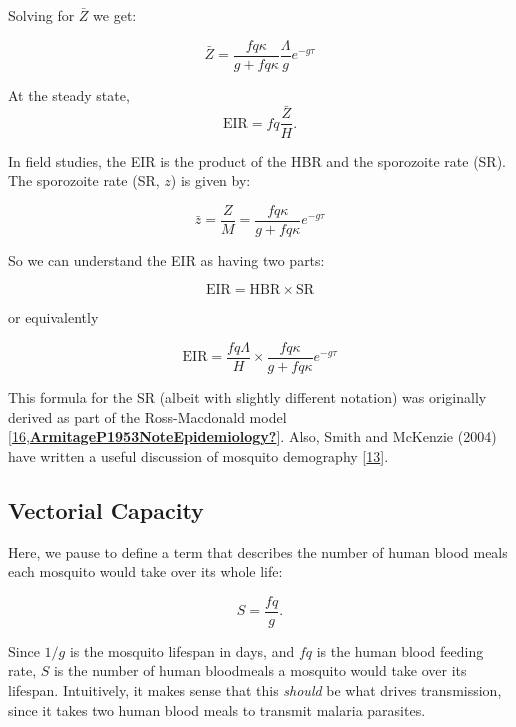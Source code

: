\documentclass[
]{book}
\begin{document}
Solving for \(\bar Z\) we get:

\begin{equation}
\bar Z =  \frac{f q \kappa}{g + fq \kappa} \frac{\Lambda}{g} e^{-g\tau} 
\end{equation}

At the steady state, \[\mbox{EIR} = fq \frac{\bar Z}{H}.\]

In field studies, the EIR is the product of the HBR and the sporozoite rate (SR). The sporozoite rate (SR, \(z\)) is given by:

\begin{equation}
\bar z =  \frac{Z}{M} = \frac{f q \kappa}{g + fq \kappa} e^{-g\tau} 
\end{equation}

So we can understand the EIR as having two parts:

\begin{equation}
\mbox{EIR} = \mbox{HBR} \times  \mbox{SR} 
\end{equation}

or equivalently

\begin{equation}
\mbox{EIR} = \frac{\textstyle{fq\Lambda}}{\textstyle{H}} \times \frac{\textstyle{f q \kappa}}{\textstyle{g + fq \kappa}} e^{-g\tau} 
\end{equation}

This formula for the SR (albeit with slightly different notation) was originally derived as part of the Ross-Macdonald model {[}\protect\hyperlink{ref-MacdonaldG1952_SporozoiteRate}{16},\protect\hyperlink{ref-ArmitageP1953NoteEpidemiology}{\textbf{ArmitageP1953NoteEpidemiology?}}{]}. Also, Smith and McKenzie (2004) have written a useful discussion of mosquito demography {[}\protect\hyperlink{ref-SmithDL2004_Statics}{13}{]}.

\hypertarget{vectorial-capacity}{%
\subsection{Vectorial Capacity}\label{vectorial-capacity}}

Here, we pause to define a term that describes the number of human blood meals each mosquito would take over its whole life:

\[S = \frac{fq}{g}.\]

Since \(1/g\) is the mosquito lifespan in days, and \(fq\) is the human blood feeding rate, \(S\) is the number of human bloodmeals a mosquito would take over its lifespan. Intuitively, it makes sense that this \emph{should} be what drives transmission, since it takes two human blood meals to transmit malaria parasites.
\end{document}
